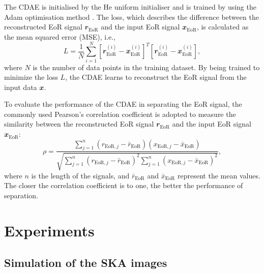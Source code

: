 \documentclass[fleqn,usenatbib]{mnras}
\newcommand{\R}[1]{\mathrm{#1}}
\newcommand{\B}[1]{\mathbfit{#1}}
\begin{document}
The CDAE is initialised by the He uniform initialiser \citep{he2015}
and is trained by using the Adam optimisation method \citep{kingma2015}.
The loss, which describes the difference between the reconstructed EoR
signal $\B{r}_{\R{EoR}}$ and the input EoR signal $\B{x}_{\R{EoR}}$,
is calculated as the mean squared error (MSE), i.e.,
\begin{equation}
  \label{eq:loss}
  L = \frac{1}{N} \sum_{i=1}^{N}
    \left[ \B{r}_{\R{EoR}}^{(i)} - \B{x}_{\R{EoR}}^{(i)} \right]^T
    \left[ \B{r}_{\R{EoR}}^{(i)} - \B{x}_{\R{EoR}}^{(i)} \right],
\end{equation}
where $N$ is the number of data points in the training dataset.
By being trained to minimize the loss $L$, the CDAE learns to
reconstruct the EoR signal from the input data $\B{x}$.

To evaluate the performance of the CDAE in separating the EoR signal,
the commonly used Pearson's correlation coefficient
\citep[e.g.,][]{harker2009,chapman2013}
is adopted to measure the similarity between the reconstructed EoR
signal $\B{r}_{\R{EoR}}$ and the input EoR signal $\B{x}_{\R{EoR}}$:
\begin{equation}
  \label{eq:corrcoef}
  \rho = \frac{\sum_{j=1}^{n}(r_{\R{EoR},j} - \bar{r}_{\R{EoR}})
      (x_{\R{EoR},j} - \bar{x}_{\R{EoR}})}{
        \sqrt{\sum_{j=1}^{n}(r_{\R{EoR},j} - \bar{r}_{\R{EoR}})^2
          \sum_{j=1}^{n}(x_{\R{EoR},j} - \bar{x}_{\R{EoR}})^2}
    },
\end{equation}
where $n$ is the length of the signals,
and $\bar{r}_{\R{EoR}}$ and $\bar{x}_{\R{EoR}}$ represent the mean values.
The closer the correlation coefficient is to one, the better the
performance of separation.


\section{Experiments}
\label{sec:experiments}

\subsection{Simulation of the SKA images}
\label{sec:simulation}
\end{document}
